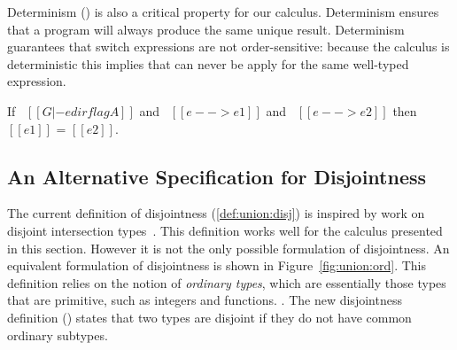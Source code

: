 Determinism () is also a
critical property for our calculus. Determinism ensures that a program will always
produce the same unique result.
Determinism guarantees that switch expressions are not order-sensitive:
because the calculus is deterministic this implies that 
can never be apply for the same well-typed expression.

\begin{lemma}[Determinism]
\label{lemma:union:determinism}
  If \ $[[G |- e dirflag A]]$ and \ $[[e --> e1]]$ and \ $[[e --> e2]]$ then $[[e1]]$ = $[[e2]]$.
\end{lemma}

\begin{comment}
\begin{proof}
  By induction on first reduction relation and inverting second reduction relation subsequently.
  All cases are trivial to solve by simple inversions except:
  \begin{itemize}
    \item Case \rref{typ-typeof} requires \cref{lemma:union:check-both-disj-false}.
  \end{itemize}
\end{proof}

\begin{lemma}[check-both-disj-false]
\label{lemma:union:check-both-disj-false}
If \ $[[A *s B]]$ \ and \ $[[G |- p <= A]]$ \ and \ $[[G |- p <= B]]$ \ then \ False.
\end{lemma}
\end{comment}


\subsection{An Alternative Specification for Disjointness}
\label{sec:union:discussion}
The current definition of disjointness (\cref{def:union:disj}) is inspired
by work on disjoint intersection types~\cite{oliveira2016disjoint}. This definition works well
for the calculus presented in this section. However it is not the only
possible formulation of disjointness.
An equivalent formulation of disjointness is shown in Figure~\ref{fig:union:ord}.
This definition relies on the notion of \emph{ordinary types}, which are essentially
those types that are primitive, such as integers and functions.
. 
The new disjointness definition () states that two
types are disjoint if they do not have common ordinary subtypes.

